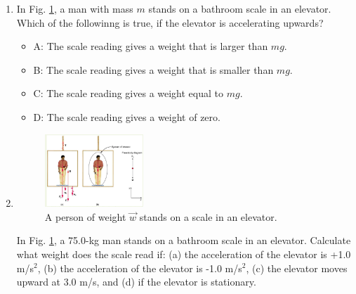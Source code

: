 \documentclass{article}
\begin{document}
\begin{enumerate}
\item In Fig. \ref{fig:elev}, a man with mass $m$ stands on a bathroom scale in an elevator.  Which of the followinng is true, if the elevator is accelerating upwards?
\begin{itemize}
\item A: The scale reading gives a weight that is larger than $mg$.
\item B: The scale reading gives a weight that is smaller than $mg$.
\item C: The scale reading gives a weight equal to $mg$.
\item D: The scale reading gives a weight of zero.
\end{itemize}
\item 
\begin{figure}[hb]
\centering
\includegraphics[width=0.35\textwidth]{elevator.png}
\caption{\label{fig:elev} A person of weight $\vec{w}$ stands on a scale in an elevator.}
\end{figure}
In Fig. \ref{fig:elev}, a 75.0-kg man stands on a bathroom scale in an elevator. Calculate what weight does the scale read if: (a) the acceleration of the elevator is +1.0 m/s$^2$, (b) the acceleration of the elevator is -1.0 m/s$^2$, (c) the elevator moves upward at 3.0 m/s, and (d) if the elevator is stationary.
\end{enumerate}
\end{document}
